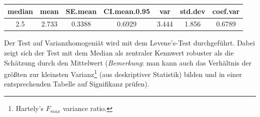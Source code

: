 \documentclass[]{article}
\let\rmarkdownfootnote\footnote%
\def\footnote{\protect\rmarkdownfootnote}
\begin{document}
\begin{longtable}[]{@{}ccccccc@{}}
\toprule
\begin{minipage}[b]{0.10\columnwidth}\centering\strut
median\strut
\end{minipage} & \begin{minipage}[b]{0.09\columnwidth}\centering\strut
mean\strut
\end{minipage} & \begin{minipage}[b]{0.11\columnwidth}\centering\strut
SE.mean\strut
\end{minipage} & \begin{minipage}[b]{0.17\columnwidth}\centering\strut
CI.mean.0.95\strut
\end{minipage} & \begin{minipage}[b]{0.09\columnwidth}\centering\strut
var\strut
\end{minipage} & \begin{minipage}[b]{0.11\columnwidth}\centering\strut
std.dev\strut
\end{minipage} & \begin{minipage}[b]{0.11\columnwidth}\centering\strut
coef.var\strut
\end{minipage}\tabularnewline
\midrule
\endhead
\begin{minipage}[t]{0.10\columnwidth}\centering\strut
2.5\strut
\end{minipage} & \begin{minipage}[t]{0.09\columnwidth}\centering\strut
2.733\strut
\end{minipage} & \begin{minipage}[t]{0.11\columnwidth}\centering\strut
0.3388\strut
\end{minipage} & \begin{minipage}[t]{0.17\columnwidth}\centering\strut
0.6929\strut
\end{minipage} & \begin{minipage}[t]{0.09\columnwidth}\centering\strut
3.444\strut
\end{minipage} & \begin{minipage}[t]{0.11\columnwidth}\centering\strut
1.856\strut
\end{minipage} & \begin{minipage}[t]{0.11\columnwidth}\centering\strut
0.6789\strut
\end{minipage}\tabularnewline
\bottomrule
\end{longtable}

Der Test auf Varianzhomogeniät wird mit dem Levene's-Test durchgeführt.
Dabei zeigt sich der Test mit dem Median als zentraler Kennwert robuster
als die Schätzung durch den Mittelwert (\emph{Bemerkung}: man kann auch
das Verhältnis der größten zur kleinsten Varianz\footnote{Hartely's
  \(F_{max}\) variance ratio.} (aus deskriptiver Statistik) bilden und
in einer entsprechenden Tabelle auf Signifikanz prüfen).
\end{document}
